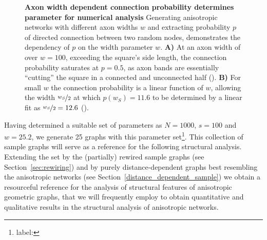 \begin{figure}[H]
  \centering
  \vspace{-0.15cm}
  \caption{\textbf{Axon width dependent connection probability
      determines parameter for numerical analysis} Generating
    anisotropic networks with different axon widths $w$ and extracting
    probability $p$ of directed connection between two random nodes,
    demonstrates the dependency of $p$ on the width parameter $w$.
    \textbf{A)} At an axon width of over $w=100$, exceeding the
    square's side length, the connection probability saturates at
    $p=0.5$, as axon bands are essentially \enquote{cutting} the
    square in a connected and unconnected half
    (). \textbf{B)} For small $w$ the connection
    probability is a linear function of $w$, allowing the width $\nicefrac{w_S}{2}$
    at which $p(w_S)=11.6$ to be determined by a linear fit as
    $\nicefrac{w_S}{2} =
    12.6$ ().} %
  \label{fig:determine_axon_width}
\end{figure}



\label{sample_graphs}Having determined a suitable set of parameters as
$N=1000$, $s=100$ and $w=25.2$, we generate 25 graphs with this parameter
set\footnote{label: }.
This collection of sample graphs will serve as a reference for the
following structural analysis. Extending the set by the (partially)
rewired sample graphs (see Section~\ref{sec:rewiring}) and by purely
distance-dependent graphs best resembling the anisotropic networks
(see Section~\ref{distance_dependent_sample}) we obtain a resourceful
reference for the analysis of structural features of anisotropic
geometric graphs, that we will frequently employ to obtain
quantitative and qualitative results in the structural analysis of
anisotropic networks.













